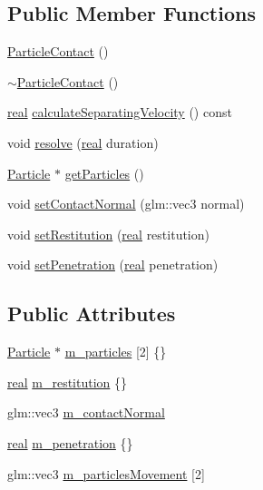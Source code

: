 \subsection*{Public Member Functions}
\begin{DoxyCompactItemize}
\item 
\mbox{\hyperlink{classrum_1_1_particle_contact_aab189df2f191ed165769f7545c0681d9}{Particle\+Contact}} ()
\item 
\mbox{\hyperlink{classrum_1_1_particle_contact_aa1f7ccaa9ef517fae352e24a9bc8e79e}{$\sim$\+Particle\+Contact}} ()
\item 
\mbox{\hyperlink{namespacerum_a7e8cca23573d5eaead0f138cbaa4862c}{real}} \mbox{\hyperlink{classrum_1_1_particle_contact_a85e06dde6b23622bf8d9f6a99205fcfc}{calculate\+Separating\+Velocity}} () const
\item 
void \mbox{\hyperlink{classrum_1_1_particle_contact_acf090d7537e78bea0e9008b55a3959c9}{resolve}} (\mbox{\hyperlink{namespacerum_a7e8cca23573d5eaead0f138cbaa4862c}{real}} duration)
\item 
\mbox{\hyperlink{classrum_1_1_particle}{Particle}} $\ast$ \mbox{\hyperlink{classrum_1_1_particle_contact_a3cccc345ae55939b5fca963e86d7deae}{get\+Particles}} ()
\item 
void \mbox{\hyperlink{classrum_1_1_particle_contact_a0626aa815eab861f15cc9dfc582452a6}{set\+Contact\+Normal}} (glm\+::vec3 normal)
\item 
void \mbox{\hyperlink{classrum_1_1_particle_contact_abf356cecb0c3c42d889a561afc901a97}{set\+Restitution}} (\mbox{\hyperlink{namespacerum_a7e8cca23573d5eaead0f138cbaa4862c}{real}} restitution)
\item 
void \mbox{\hyperlink{classrum_1_1_particle_contact_ab31f404b4e571262ade5c9d8b1f36f97}{set\+Penetration}} (\mbox{\hyperlink{namespacerum_a7e8cca23573d5eaead0f138cbaa4862c}{real}} penetration)
\end{DoxyCompactItemize}
\subsection*{Public Attributes}
\begin{DoxyCompactItemize}
\item 
\mbox{\hyperlink{classrum_1_1_particle}{Particle}} $\ast$ \mbox{\hyperlink{classrum_1_1_particle_contact_a01267c3d6f9227b318a7b49182d01006}{m\+\_\+particles}} \mbox{[}2\mbox{]} \{\}
\item 
\mbox{\hyperlink{namespacerum_a7e8cca23573d5eaead0f138cbaa4862c}{real}} \mbox{\hyperlink{classrum_1_1_particle_contact_a0be16bc823ae27866228345eb3349482}{m\+\_\+restitution}} \{\}
\item 
glm\+::vec3 \mbox{\hyperlink{classrum_1_1_particle_contact_a8b0d26e0c773a739f34eb27d7e8d9c17}{m\+\_\+contact\+Normal}}
\item 
\mbox{\hyperlink{namespacerum_a7e8cca23573d5eaead0f138cbaa4862c}{real}} \mbox{\hyperlink{classrum_1_1_particle_contact_a935966849508ec47d3c6330816f873de}{m\+\_\+penetration}} \{\}
\item 
glm\+::vec3 \mbox{\hyperlink{classrum_1_1_particle_contact_ab03921d708387e5bbc3a0c01f1f5a3da}{m\+\_\+particles\+Movement}} \mbox{[}2\mbox{]}
\end{DoxyCompactItemize}
